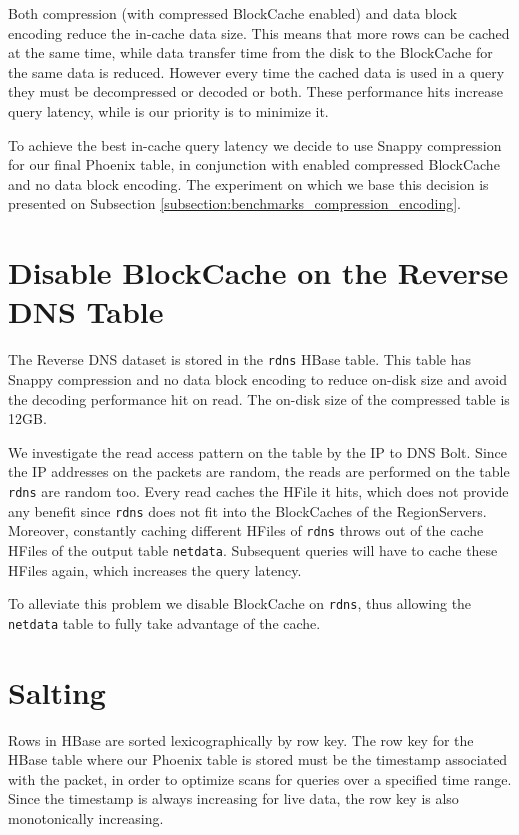 Both compression (with compressed BlockCache enabled) and data block encoding reduce the in-cache data size. This means that more rows can be cached at the same time, while data transfer time from the disk to the BlockCache for the same data is reduced. However every time the cached data is used in a query they must be decompressed or decoded or both. These performance hits increase query latency, while is our priority is to minimize it.

To achieve the best in-cache query latency we decide to use Snappy compression for our final Phoenix table, in conjunction with enabled compressed BlockCache and no data block encoding. The experiment on which we base this decision is presented on Subsection \ref{subsection:benchmarks_compression_encoding}.


\section{Disable BlockCache on the Reverse DNS Table}

The Reverse DNS dataset is stored in the \texttt{rdns} HBase table. This table has Snappy compression and no data block encoding to reduce on-disk size and avoid the decoding performance hit on read. The on-disk size of the compressed table is 12GB.

We investigate the read access pattern on the table by the IP to DNS Bolt. Since the IP addresses on the packets are random, the reads are performed on the table \texttt{rdns} are random too. Every read caches the HFile it hits, which does not provide any benefit since \texttt{rdns} does not fit into the BlockCaches of the RegionServers. Moreover, constantly caching different HFiles of \texttt{rdns} throws out of the cache HFiles of the output table \texttt{netdata}. Subsequent queries will have to cache these HFiles again, which increases the query latency.

To alleviate this problem we disable BlockCache on \texttt{rdns}, thus allowing the \texttt{netdata} table to fully take advantage of the cache.


\section{Salting}\label{section:optimizations_salting}

Rows in HBase are sorted lexicographically by row key. The row key for the HBase table where our Phoenix table is stored must be the timestamp associated with the packet, in order to optimize scans for queries over a specified time range. Since the timestamp is always increasing for live data, the row key is also monotonically increasing.

